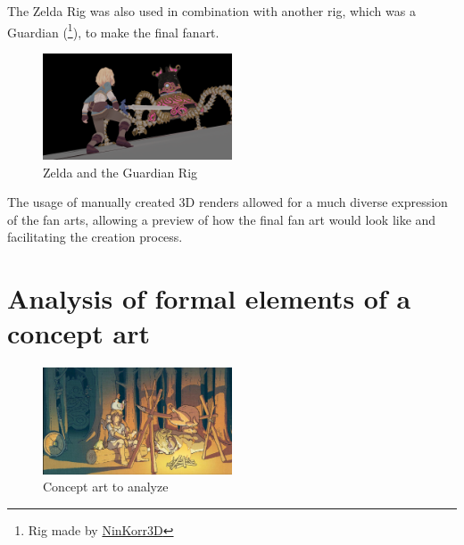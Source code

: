 \documentclass{cup-pan}
\begin{document}
    The Zelda Rig was also used in combination with another rig, which was a Guardian 
    (\footnote{Rig made by 
        \href{https://sketchfab.com/3d-models/guardian-zelda-botw-fan-art-990a6a9434c849329360ea1ef9078895}{NinKorr3D}}), to make the final fanart.
    \begin{figure}[H]
        \includegraphics[width=0.5\textwidth]{Imagenes/Referencias/referencia art 2.png}
        \caption{Zelda and the Guardian Rig}
    \end{figure}

    The usage of manually created 3D renders allowed for a much diverse expression of the fan arts, allowing a preview of how the final fan art would look like and facilitating the creation process.\\


\section{Analysis of formal elements of a concept art}
    \begin{figure}[H]
       \includegraphics[width=0.5\textwidth]{Imagenes/Referencias/conceptart_a_analizar.png}
        \caption{Concept art to analyze}
    \end{figure}

\end{document}
